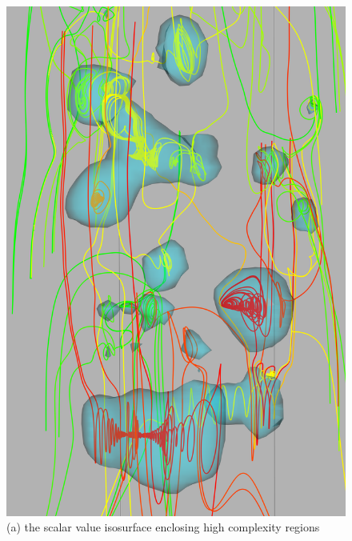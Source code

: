 \documentclass{egpubl}
\begin{document}
\begin{figure}[h]
        \centering
                \begin{minipage}{0.47\linewidth}
                        \small
                        \includegraphics[height = 1.47\linewidth]{Images/iso_crop.png}\\(a) the scalar value isosurface enclosing high complexity regions\vspace{0.2em}
                \end{minipage}
                \begin{minipage}{0.47\linewidth}
                        \small

\end{minipage}
\end{figure}
\end{document}
